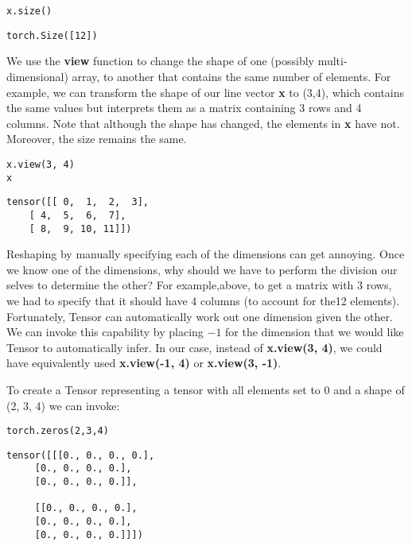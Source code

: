 \documentclass[]{article}
\begin{document}
\begin{verbatim}
x.size()
\end{verbatim}

\begin{verbatim}
torch.Size([12])
\end{verbatim}

We use the \textbf{view} function to change the shape of one (possibly multi-dimensional) array, to another that contains the same number of elements. For example, we can transform the shape of our line vector \textbf{x} to (3,4), which contains the same values but interprets them as a matrix containing 3 rows and 4 columns. Note that although the shape has changed, the elements in \textbf{x} have not. Moreover, the size remains the same.

\begin{verbatim}
x.view(3, 4)
x
\end{verbatim}

\begin{verbatim}
tensor([[ 0,  1,  2,  3],
	[ 4,  5,  6,  7],
	[ 8,  9, 10, 11]])
\end{verbatim}

Reshaping by manually specifying each of the dimensions can get annoying.  Once we know one of the dimensions, why should we have to perform the division our selves to determine the other? For example,above, to get a matrix with 3 rows, we had to specify that it should have 4 columns (to account for the12 elements). Fortunately, Tensor can automatically work out one dimension given the other. We can invoke this capability by placing $ -1 $ for the dimension that we would like Tensor to automatically infer. In our case, instead of \textbf{x.view(3, 4)}, we could have equivalently used \textbf{x.view(-1, 4)} or \textbf{x.view(3, -1)}.

To create a Tensor representing a tensor with all elements set to 0 and a shape of (2, 3, 4) we can invoke:

\begin{verbatim}
torch.zeros(2,3,4)
\end{verbatim}

\begin{verbatim}
tensor([[[0., 0., 0., 0.],
	 [0., 0., 0., 0.],
	 [0., 0., 0., 0.]],
	
	 [[0., 0., 0., 0.],
	 [0., 0., 0., 0.],
	 [0., 0., 0., 0.]]])
\end{verbatim}
\end{document}
